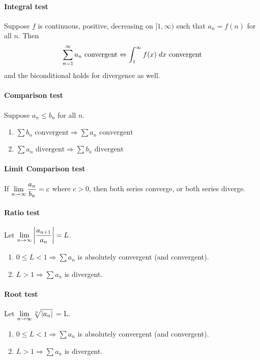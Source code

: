 \documentclass[a4paper]{article}
\newcommand{\convergent}{\text{ convergent}}
\newcommand{\divergent}{\text{ divergent}}
\begin{document}
\begin{multicols*}{3}
      \paragraph{Integral test}
        Suppose $f$ is continuous, positive, decreasing on $[1, \infty)$ such that $a_n = f(n)$ for all $n$. Then
        \begin{equation*}
          \sum_{n=1}^\infty a_n \convergent \Leftrightarrow \dinteg{1}{\infty}{f(x)}{x} \convergent
        \end{equation*}
        and the biconditional holds for divergence as well.
      \paragraph{Comparison test}
        Suppose $a_n \leq b_n$ for all $n$.
        \begin{enumerate}[label=(\roman*)]
          \item $\sum b_n \convergent \Rightarrow \sum a_n \convergent$
          \item $\sum a_n \divergent \Rightarrow \sum b_n \divergent$
        \end{enumerate}
      \paragraph{Limit Comparison test}
        If $\displaystyle \lim_{n \rightarrow \infty} \dfrac{a_n}{b_n} = c$ where $c > 0$, then both series converge, or both series diverge.
      \paragraph{Ratio test}
        Let $\displaystyle \lim_{n \rightarrow \infty} \left\lvert\dfrac{a_{n+1}}{a_n}\right\rvert = L$.
        \begin{enumerate}[label=(\roman*)]
          \item $0 \leq L < 1 \Rightarrow \sum a_n$ is absolutely convergent (and convergent).
          \item $L > 1 \Rightarrow \sum a_n$ is divergent.
        \end{enumerate}
      \paragraph{Root test}
        Let $\displaystyle \lim_{n \rightarrow \infty} \sqrt[n]{\left\lvert a_n\right\rvert}$ = L.
        \begin{enumerate}[label=(\roman*)]
          \item $0 \leq L < 1 \Rightarrow \sum a_n$ is absolutely convergent (and convergent).
          \item $L > 1 \Rightarrow \sum a_n$ is divergent.
        \end{enumerate}

\end{multicols*}
\end{document}
